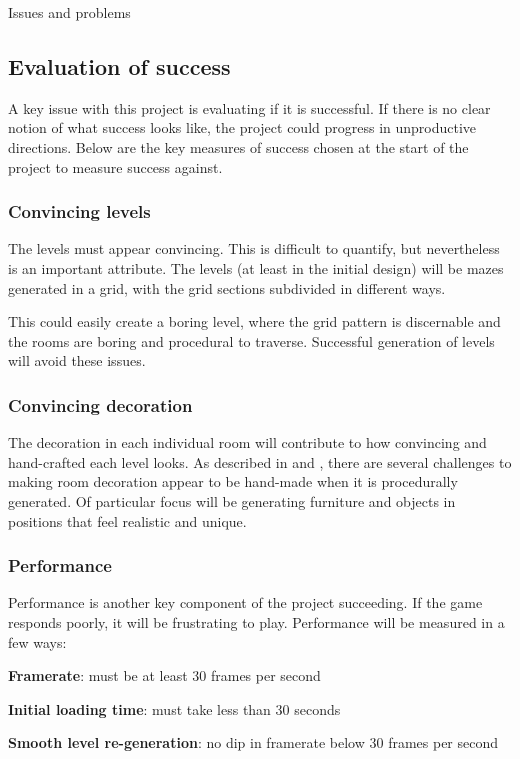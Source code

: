 \documentclass[progress]{cmpreport}
\begin{document}
\begin{section}{Issues and problems}
\subsection{Evaluation of success} \label{evalsuccess}
A key issue with this project is evaluating if it is successful. If there is no clear notion of what success looks like, the project could progress in unproductive directions. Below are the key measures of success chosen at the start of the project to measure success against.

\subsubsection{Convincing levels}
The levels must appear convincing. This is difficult to quantify, but nevertheless is an important attribute. The levels (at least in the initial design) will be mazes generated in a grid, with the grid sections subdivided in different ways.

This could easily create a boring level, where the grid pattern is discernable and the rooms are boring and procedural to traverse. Successful generation of levels will avoid these issues.

\subsubsection{Convincing decoration}
The decoration in each individual room will contribute to how convincing and hand-crafted each level looks. As described in \cite{doi:10.1111/j.1467-8659.2009.01351.x} and \cite{taylor-parberry}, there are several challenges to making room decoration appear to be hand-made when it is procedurally generated. Of particular focus will be generating furniture and objects in positions that feel realistic and unique.

\subsubsection{Performance}
Performance is another key component of the project succeeding. If the game responds poorly, it will be frustrating to play. Performance will be measured in a few ways:
\newline
\begin{compactitem}
    \item{\textbf{Framerate}: must be at least 30 frames per second}
    \item{\textbf{Initial loading time}: must take less than 30 seconds}
    \item{\textbf{Smooth level re-generation}: no dip in framerate below 30 frames per second}
\end{compactitem}



\end{section}
\end{document}
